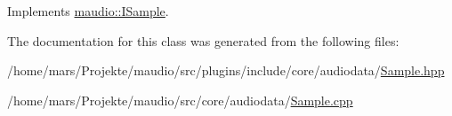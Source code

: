 Implements \hyperlink{classmaudio_1_1ISample_a0b65702ea137559932feee764cfc190e}{maudio\-::\-I\-Sample}.



The documentation for this class was generated from the following files\-:\begin{DoxyCompactItemize}
\item 
/home/mars/\-Projekte/maudio/src/plugins/include/core/audiodata/\hyperlink{Sample_8hpp}{Sample.\-hpp}\item 
/home/mars/\-Projekte/maudio/src/core/audiodata/\hyperlink{core_2audiodata_2Sample_8cpp}{Sample.\-cpp}\end{DoxyCompactItemize}
